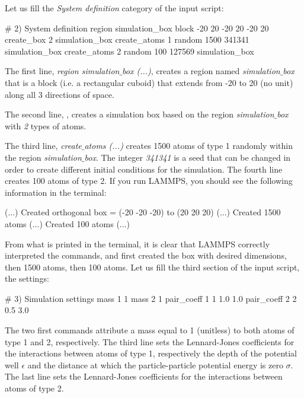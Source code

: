 \noindent Let us fill the \textit{System definition} category of the input script:

\begin{lcverbatim}
# 2) System definition
region simulation_box block -20 20 -20 20 -20 20
create_box 2 simulation_box
create_atoms 1 random 1500 341341 simulation_box
create_atoms 2 random 100 127569 simulation_box
\end{lcverbatim}

\noindent The first line, \textit{region simulation$\_$box (...)}, creates a region
named \textit{simulation$\_$box} that is a block (i.e. a rectangular cuboid) that
extends from -20 to 20 (no unit) along all 3 directions of space.

The second line, , creates a simulation box based on
the region \textit{simulation$\_$box} with \textit{2} types of atoms.

The third line, \textit{create$\_$atoms (...)} creates 1500 atoms of type 1
randomly within the region \textit{simulation$\_$box}. The integer \textit{341341} is a
seed that can be changed in order to create different
initial conditions for the simulation. The fourth line
creates 100 atoms of type 2.
If you run LAMMPS, you should see the following information in the
terminal:

\begin{lcverbatim}
(...)
Created orthogonal box = (-20 -20 -20) to (20 20 20)
(...)
Created 1500 atoms
(...)
Created 100 atoms
(...)
\end{lcverbatim}

\noindent From what is printed in the terminal, it is clear that
LAMMPS correctly interpreted the commands, and first created
the box with desired dimensions, then 1500 atoms, then 100
atoms.
Let us fill the third section of the input script, the settings:

\begin{lcverbatim}
# 3) Simulation settings
mass 1 1
mass 2 1
pair_coeff 1 1 1.0 1.0
pair_coeff 2 2 0.5 3.0
\end{lcverbatim}

\noindent The two first commands attribute a mass
equal to 1 (unitless) to both atoms of type 1 and 2,
respectively. The third line sets the Lennard-Jones
coefficients for the interactions between atoms of type 1,
respectively the depth of the potential well
$\epsilon$ and the distance at which the
particle-particle potential energy is zero $\sigma$. 
The last line sets the Lennard-Jones coefficients for
the interactions between atoms of type 2.

